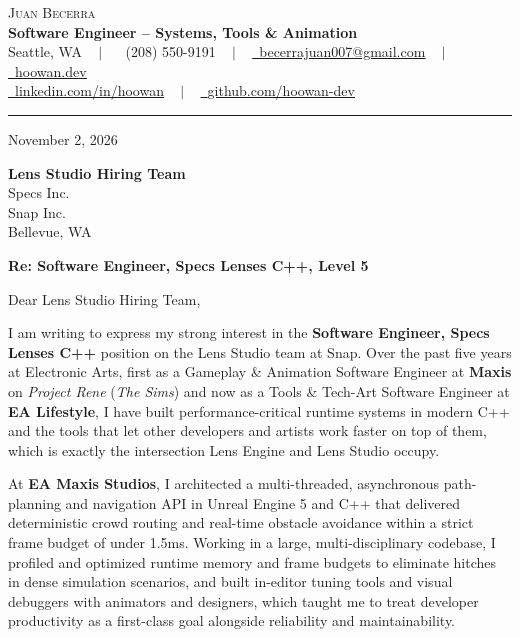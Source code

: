 \documentclass[letterpaper,11pt]{article}
\begin{document}
\begin{center}
    {\Huge \scshape Juan Becerra} \\ \vspace{4pt}
    \textbf{\large Software Engineer -- Systems, Tools \& Animation} \\ \vspace{4pt}
    \small Seattle, WA ~ $|$ ~
    \raisebox{-0.1\height}\faPhone\ (208) 550-9191 ~ $|$ ~
    \href{mailto:becerrajuan007@gmail.com}{\raisebox{-0.2\height}\faEnvelope\ \underline{becerrajuan007@gmail.com}} ~ $|$ ~
    \href{https://hoowan.dev}{\raisebox{-0.2\height}\faGlobe\ \underline{hoowan.dev}} \\ \vspace{2pt}
    \href{https://linkedin.com/in/hoowan/}{\raisebox{-0.2\height}\faLinkedin\ \underline{linkedin.com/in/hoowan}} ~ $|$ ~
    \href{https://github.com/hoowan-dev}{\raisebox{-0.2\height}\faGithub\ \underline{github.com/hoowan-dev}}
\end{center}

\vspace{4pt}
\hrule
\vspace{14pt}

\noindent November 2, 2026

\vspace{8pt}
\noindent \textbf{Lens Studio Hiring Team} \\
Specs Inc. \\
Snap Inc. \\
Bellevue, WA

\vspace{8pt}
\noindent \textbf{Re: Software Engineer, Specs Lenses C++, Level 5}

\vspace{8pt}
\noindent Dear Lens Studio Hiring Team,

I am writing to express my strong interest in the \textbf{Software Engineer, Specs Lenses C++} position on the 
Lens Studio team at Snap. Over the past five years at Electronic Arts, first as a Gameplay \& Animation 
Software Engineer at \textbf{Maxis} on \emph{Project Rene} (\emph{The Sims}) and now as a Tools \& Tech-Art 
Software Engineer at \textbf{EA Lifestyle}, I have built performance-critical runtime systems in modern C++ 
and the tools that let other developers and artists work faster on top of them, which is exactly the
intersection Lens Engine and Lens Studio occupy.

At \textbf{EA Maxis Studios}, I architected a multi-threaded, asynchronous path-planning and navigation API 
in Unreal Engine 5 and C++ that delivered deterministic crowd routing and real-time obstacle avoidance 
within a strict frame budget of under 1.5ms. Working in a large, multi-disciplinary codebase, I profiled
and optimized runtime memory and frame budgets to eliminate hitches in dense simulation scenarios, and
built in-editor tuning tools and visual debuggers with animators and designers, which taught me to treat
developer productivity as a first-class goal alongside reliability and maintainability.
\end{document}
